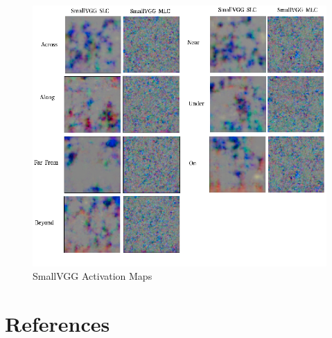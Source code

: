 \documentclass{csfyp}
\begin{document}
\begin{figure}[!htbp]
	\includegraphics[scale=0.60,center]{Small_Spatial_2.pdf}
	\caption{SmallVGG Activation Maps}
\end{figure}

\section{References}
{}

\end{document}
